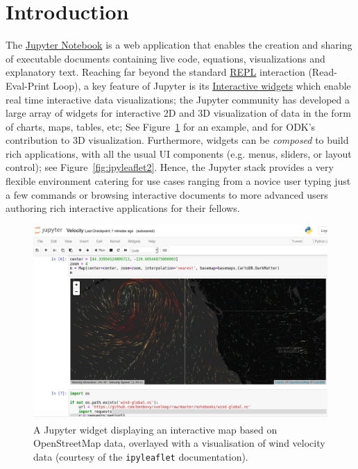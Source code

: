 \documentclass{deliverablereport}
\author{Odile Bénassy and Nicolas M. Thiéry}
\begin{document}
\maketitle
\githubissuedescription

\clearpage
\tableofcontents

\section{Introduction}

The \href{https://jupyter.org}{Jupyter Notebook} is a web application
that enables the creation and sharing of executable documents
containing live code, equations, visualizations and explanatory text.
Reaching far beyond the standard
\href{https://en.wikipedia.org/wiki/Read-eval-print_loop}{REPL}
interaction (Read-Eval-Print Loop), a key feature of Jupyter is its
\href{http://jupyter.org/widgets}{Interactive widgets} which enable
real time interactive data visualizations; the Jupyter community has
developed a large array of widgets for interactive 2D and 3D
visualization of data in the form of charts, maps, tables, etc;
See Figure~\ref{fig:ipyleaflet} for an example, and
 for ODK's contribution to 3D visualization.
Furthermore, widgets can be \emph{composed} to build rich
applications, with all the usual UI components (e.g. menus, sliders,
or layout control); see Figure~\ref{fig:ipyleaflet2}.
%
Hence, the Jupyter stack provides a very flexible environment catering
for use cases ranging from a novice user typing just a few commands
or browsing interactive documents to more advanced users authoring
rich interactive applications for their fellows.

\begin{figure}[h]
  \begin{center}
    \includegraphics[width=\textwidth]{images/Velocity}
  \caption{A Jupyter widget displaying an interactive map based on
  OpenStreetMap data, overlayed with a visualisation of wind velocity
  data \tiny{(courtesy of the \lstinline{ipyleaflet} documentation)}.}
  \label{fig:ipyleaflet}
  \end{center}
\end{figure}
\end{document}
